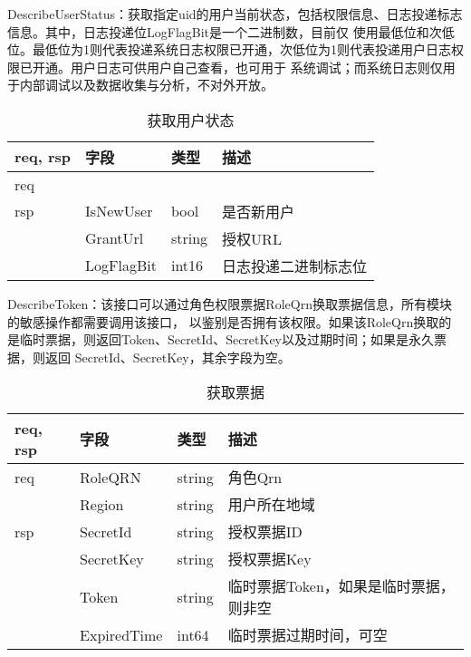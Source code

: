DescribeUserStatus：获取指定uid的用户当前状态，包括权限信息、日志投递标志信息。其中，日志投递位LogFlagBit是一个二进制数，目前仅
使用最低位和次低位。最低位为1则代表投递系统日志权限已开通，次低位为1则代表投递用户日志权限已开通。用户日志可供用户自己查看，也可用于
系统调试；而系统日志则仅用于内部调试以及数据收集与分析，不对外开放。
    \begin{table}[H]
        \centering
        \caption{获取用户状态}
        \label{tab:design-interface-user-status}
        \begin{tabular}{llll}
            \toprule
            req, rsp   & 字段 & 类型 & 描述 \\
            \midrule
            req &&& \\ \hline
            rsp & IsNewUser & bool & 是否新用户 \\
            & GrantUrl & string & 授权URL\\
            & LogFlagBit & int16 & 日志投递二进制标志位\\
            \bottomrule
        \end{tabular}
    \end{table}

    DescribeToken：该接口可以通过角色权限票据RoleQrn换取票据信息，所有模块的敏感操作都需要调用该接口，
以鉴别是否拥有该权限。如果该RoleQrn换取的是临时票据，则返回Token、SecretId、SecretKey以及过期时间；如果是永久票据，则返回
SecretId、SecretKey，其余字段为空。

    \begin{table}[H]
        \centering
        \caption{获取票据}
        \label{tab:design-interface-describe-token}
        \begin{tabular}{llll}
            \toprule
            req, rsp   & 字段 & 类型 & 描述 \\
            \midrule
            req & RoleQRN & string & 角色Qrn \\
            & Region & string & 用户所在地域 \\ \hline
            rsp & SecretId & string & 授权票据ID\\
            & SecretKey & string & 授权票据Key\\
            & Token & string & 临时票据Token，如果是临时票据，则非空\\
            & ExpiredTime & int64 & 临时票据过期时间，可空\\
            \bottomrule
        \end{tabular}
    \end{table}


